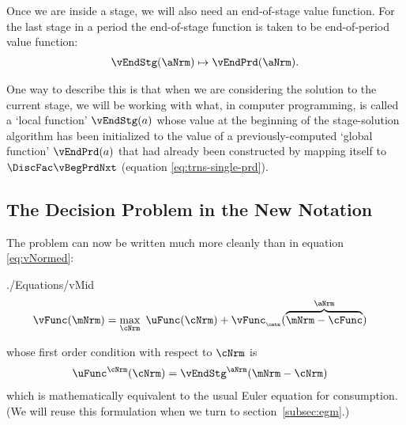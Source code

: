 \documentclass[\econtexRoot/SolvingMicroDSOPs]{subfiles}
\begin{document}
Once we are inside a {stage}, we will also need an end-of-{stage} value function.  For the last {stage} in a {period} the end-of-{stage} function is taken to be end-of-{period} value function:
  \begin{equation}\begin{gathered}\begin{aligned}
        \vEndStg(\aNrm) \mapsto \vEndPrd(\aNrm).
      \end{aligned}\end{gathered}\end{equation}

One way to describe this is that when we are considering the solution to the current {stage}, we will be working with what, in computer programming, is called a `local function' $\vEndStg(a)$ whose value at the beginning of the {stage}-solution algorithm has been initialized to the value of a previously-computed `global function' $\vEndPrd(a)$ that had already been constructed by mapping itself to $\DiscFac \vBegPrdNxt$ (equation \eqref{eq:trns-single-prd}).
\hypertarget{decision-problem}{}

\subsection{The Decision Problem in the New Notation}\label{subsec:decision-problem}

The {\Decision} problem can now be written much more cleanly than in equation \eqref{eq:vNormed}:
\begin{verbatimwrite}{./Equations/vMid}
  \begin{equation}\begin{gathered}\begin{aligned}
        \vFunc(\mNrm) & = \max_{\cNrm}~ \uFunc(\cNrm) + \vFunc_{_\cntn}(\overbrace{\mNrm-\cFunc}^{\aNrm}) \label{eq:vMid}
      \end{aligned}\end{gathered}\end{equation}
\end{verbatimwrite}
\unskip
whose first order condition with respect to $\cNrm$ is
\begin{equation}\begin{gathered}\begin{aligned}
  \uFunc^{\cNrm}(\cNrm) &= \vEndStg^{\aNrm}(\mNrm-\cNrm)  \label{eq:upEqbetaOp} 
\end{aligned}\end{gathered}\end{equation}
which is mathematically equivalent to the usual Euler equation for consumption.  (We will reuse this formulation when we turn to section~\ref{subsec:egm}.)
\end{document}
